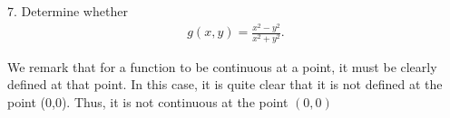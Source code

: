 \documentclass{report}
\begin{document}
        \bigbreak \noindent 
        \begin{mdframed}
            7. Determine whether 
            \begin{align*}
                g(x,y) = \frac{x^{2}-y^{2}}{x^{2} + y^{2}}
            .\end{align*}
        \end{mdframed}
        \bigbreak \noindent 
        We remark that for a function to be continuous at a point, it must be clearly defined at that point. In this case, it is quite clear that it is not defined at the point (0,0). Thus, it is not continuous at the point $(0,0)$



    




 
\end{document}
